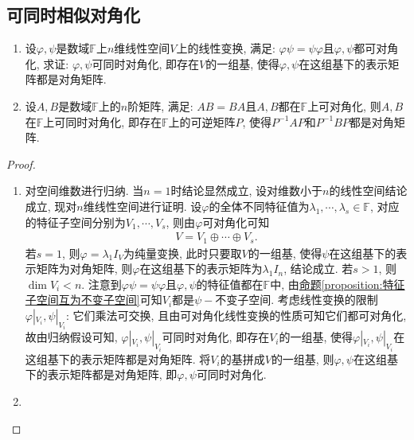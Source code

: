 \documentclass[../../main.tex]{subfiles}
\begin{document}
\subsection{可同时相似对角化}

\begin{proposition}\label{proposition:乘法可交换诱导同时对角化}
\begin{enumerate}
\item 设\(\varphi,\psi\)是数域\(\mathbb{F}\)上\(n\)维线性空间\(V\)上的线性变换, 满足: \(\varphi\psi = \psi\varphi\)且\(\varphi,\psi\)都可对角化, 求证: \(\varphi,\psi\)可同时对角化, 即存在\(V\)的一组基, 使得\(\varphi,\psi\)在这组基下的表示矩阵都是对角矩阵.

\item 设\(A,B\)是数域\(\mathbb{F}\)上的\(n\)阶矩阵, 满足: \(AB = BA\)且\(A,B\)都在\(\mathbb{F}\)上可对角化, 则\(A,B\)在\(\mathbb{F}\)上可同时对角化, 即存在\(\mathbb{F}\)上的可逆矩阵\(P\), 使得\(P^{-1}AP\)和\(P^{-1}BP\)都是对角矩阵.
\end{enumerate}
\end{proposition}
\begin{proof}
\begin{enumerate}
\item 对空间维数进行归纳. 当\(n = 1\)时结论显然成立, 设对维数小于\(n\)的线性空间结论成立, 现对\(n\)维线性空间进行证明. 设\(\varphi\)的全体不同特征值为\(\lambda_{1},\cdots ,\lambda_{s} \in \mathbb{F}\), 对应的特征子空间分别为\(V_{1},\cdots ,V_{s}\), 则由\(\varphi\)可对角化可知
\begin{align*}
V = V_{1}\oplus\cdots\oplus V_{s}.
\end{align*}
若\(s = 1\), 则\(\varphi=\lambda_{1}I_{V}\)为纯量变换, 此时只要取\(V\)的一组基, 使得\(\psi\)在这组基下的表示矩阵为对角矩阵, 则\(\varphi\)在这组基下的表示矩阵为\(\lambda_{1}I_{n}\), 结论成立. 若\(s > 1\), 则\(\dim V_{i}< n\). 注意到\(\varphi\psi = \psi\varphi\)且\(\varphi,\psi\)的特征值都在\(\mathbb{F}\)中, 由\hyperref[proposition:特征子空间互为不变子空间]{命题\ref{proposition:特征子空间互为不变子空间}}可知\(V_{i}\)都是\(\psi -\)不变子空间. 考虑线性变换的限制\(\varphi|_{V_{i}},\psi|_{V_{i}}\): 它们乘法可交换, 且由可对角化线性变换的性质可知它们都可对角化, 故由归纳假设可知, \(\varphi|_{V_{i}},\psi|_{V_{i}}\)可同时对角化, 即存在\(V_{i}\)的一组基, 使得\(\varphi|_{V_{i}},\psi|_{V_{i}}\)在这组基下的表示矩阵都是对角矩阵. 将\(V_{i}\)的基拼成\(V\)的一组基, 则\(\varphi,\psi\)在这组基下的表示矩阵都是对角矩阵, 即\(\varphi,\psi\)可同时对角化.

\item 
\end{enumerate}

\end{proof}
\end{document}
